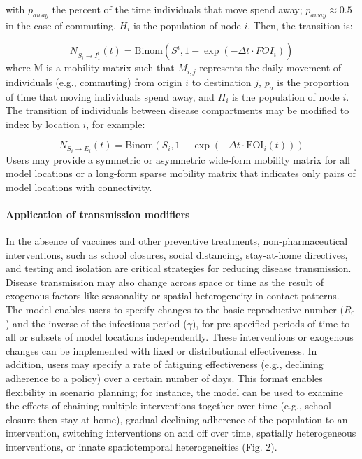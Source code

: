 with $p_{away}$ the percent of the time individuals that move spend away; $p_{away} \approx 0.5$ in the case of commuting. $H_i$ is the population of node $i$. Then, the transition is:

\begin{equation}
N_{S_i \longrightarrow I_1^{i}}(t) = \text{Binom}(S^i, 1 - \exp(-\Delta t \cdot FOI_i))
\end{equation}
where M is a mobility matrix such that $M_{i,j}$ represents the daily movement of individuals (e.g., commuting) from origin $i$ to destination $j$, $p_a$ is the proportion of time that moving individuals spend away, and $H_i$ is the population of node $i$. The transition of individuals between disease compartments may be modified to index by location $i$, for example:

\begin{equation}
N_{S_i \to E_i} (t) = \text{Binom}\left(S_i ,1 - \exp \left(- \Delta t \cdot\text{FOI}_{i}(t) \right) \right)
\end{equation}
Users may provide a symmetric or asymmetric wide-form mobility matrix for all model locations or a long-form sparse mobility matrix that indicates only pairs of model locations with connectivity.

\paragraph{Application of transmission modifiers}
In the absence of vaccines and other preventive treatments, non-pharmaceutical interventions, such as school closures, social distancing, stay-at-home directives, and testing and isolation are critical strategies for reducing disease transmission. Disease transmission may also change across space or time as the result of exogenous factors like seasonality or spatial heterogeneity in contact patterns. The model enables users to specify changes to the basic reproductive number ($R_0$) and the inverse of the infectious period ($\gamma$), for pre-specified periods of time to all or subsets of model locations independently. These interventions or exogenous changes can be implemented with fixed or distributional effectiveness. In addition, users may specify a rate of fatiguing effectiveness (e.g., declining adherence to a policy) over a certain number of days. This format enables flexibility in scenario planning; for instance, the model can be used to examine the effects of chaining multiple interventions together over time (e.g., school closure then stay-at-home), gradual declining adherence of the population to an intervention, switching interventions on and off over time, spatially heterogeneous interventions, or innate spatiotemporal heterogeneities (Fig. 2).

